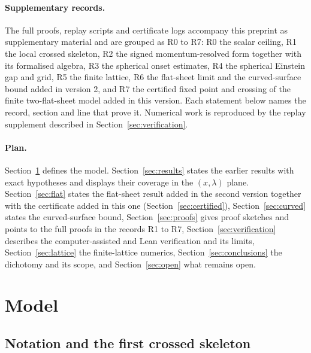 \documentclass[11pt]{article}
\theoremstyle{definition}
\theoremstyle{remark}
\begin{document}
\paragraph{Supplementary records.} The full proofs, replay scripts and certificate logs accompany this preprint as supplementary material and are grouped as R0 to R7: R0 the scalar ceiling, R1 the local crossed skeleton, R2 the signed momentum-resolved form together with its formalised algebra, R3 the spherical onset estimates, R4 the spherical Einstein gap and grid, R5 the finite lattice, R6 the flat-sheet limit and the curved-surface bound added in version 2, and R7 the certified fixed point and crossing of the finite two-flat-sheet model added in this version. Each statement below names the record, section and line that prove it. Numerical work is reproduced by the replay supplement described in Section~\ref{sec:verification}.

\paragraph{Plan.} Section~\ref{sec:model} defines the model. Section~\ref{sec:results} states the earlier results with exact hypotheses and displays their coverage in the $(x,\lambda)$ plane. Section~\ref{sec:flat} states the flat-sheet result added in the second version together with the certificate added in this one (Section~\ref{sec:certified}), Section~\ref{sec:curved} states the curved-surface bound, Section~\ref{sec:proofs} gives proof sketches and points to the full proofs in the records R1 to R7, Section~\ref{sec:verification} describes the computer-assisted and Lean verification and its limits, Section~\ref{sec:lattice} the finite-lattice numerics, Section~\ref{sec:conclusions} the dichotomy and its scope, and Section~\ref{sec:open} what remains open.

\section{Model}\label{sec:model}

\subsection{Notation and the first crossed skeleton}
\end{document}
